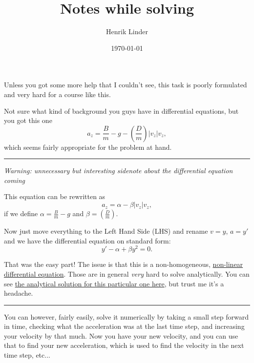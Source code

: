 \documentclass{article}
\title{Notes while solving}
\author{Henrik Linder}
\date{\today}
\begin{document}
\maketitle

Unless you got some more help that I couldn't see, this task is poorly formulated and very hard for a course like this.

Not sure what kind of background you guys have in differential equations, but you got this one
\begin{equation}
	a_z = \frac{B}{m} - g - \left(\frac{D}{m}\right)  \left| v_z\right| v_z, 
\end{equation}
which seems fairly appropriate for the problem at hand.

\noindent\rule{\linewidth}{.4pt}

\textit{Warning: unnecessary but interesting sidenote about the differential equation coming}

This equation can be rewritten as 
\begin{equation}
	a_z = \alpha - \beta  \left| v_z\right| v_z, 
\end{equation}
if we define $\alpha = \frac{B}{m} - g$ and $\beta = \left(\frac{D}{m}\right)$. 

Now just move everything to the Left Hand Side (LHS) and rename $v = y$, $a = y'$ and we have the differential equation on standard form: 
\begin{equation}
	y' - \alpha + \beta y^2 = 0 .
\end{equation}

That was the easy part! The issue is that this is a non-homogeneous, \href{https://en.wikipedia.org/wiki/Differential\_equation#Non-linear\_differential\_equations}{non-linear differential equation}. Those are in general \textit{very} hard to solve analytically. You can see \href{https://www.wolframalpha.com/input?i=y\%27++-+alpha+\%2B+beta+*+y\%5E2+\%3D+0}{the analytical solution for this particular one here}, but trust me it's a headache. 


\noindent\rule{\linewidth}{.4pt}

You can however, fairly easily, solve it numerically by taking a small step forward in time, checking what the acceleration was at the last time step, and increasing your velocity by that much. Now you have your new velocity, and you can use that to find your new acceleration, which is used to find the velocity in the next time step, etc... 
\end{document}
